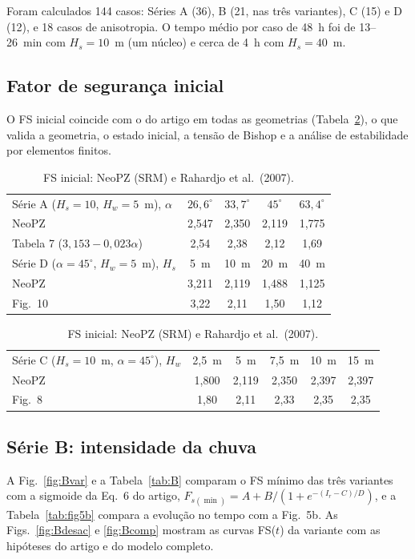 Foram calculados 144 casos: S\'eries A (36), B (21, nas tr\^es variantes), C (15) e D (12), e 18 casos de
anisotropia. O tempo m\'edio por caso de 48~h foi de 13--26~min com $H_s=10$~m (um n\'ucleo) e cerca de 4~h com
$H_s=40$~m.

\subsection{Fator de seguran\c{c}a inicial}

O FS inicial coincide com o do artigo em todas as geometrias (Tabela~\ref{tab:fsini}), o que valida a geometria, o
estado inicial, a tens\~ao de Bishop e a an\'alise de estabilidade por elementos finitos.

\begin{table}[htbp]
\centering
\caption{FS inicial: NeoPZ (SRM) e Rahardjo et al.\ (2007).}\label{tab:fsini}
\begin{tabular}{lcccc}
\toprule
S\'erie A ($H_s=10$, $H_w=5$~m), $\alpha$ & $26{,}6^\circ$ & $33{,}7^\circ$ & $45^\circ$ & $63{,}4^\circ$\\
NeoPZ & 2,547 & 2,350 & 2,119 & 1,775\\
Tabela 7 ($3{,}153-0{,}023\alpha$) & 2,54 & 2,38 & 2,12 & 1,69\\
\midrule
S\'erie D ($\alpha=45^\circ$, $H_w=5$~m), $H_s$ & 5~m & 10~m & 20~m & 40~m\\
NeoPZ & 3,211 & 2,119 & 1,488 & 1,125\\
Fig.~10 & 3,22 & 2,11 & 1,50 & 1,12\\
\bottomrule
\end{tabular}

\vspace{6pt}
\begin{tabular}{lccccc}
\toprule
S\'erie C ($H_s=10$~m, $\alpha=45^\circ$), $H_w$ & 2,5~m & 5~m & 7,5~m & 10~m & 15~m\\
NeoPZ & 1,800 & 2,119 & 2,350 & 2,397 & 2,397\\
Fig.~8 & 1,80 & 2,11 & 2,33 & 2,35 & 2,35\\
\bottomrule
\end{tabular}
\end{table}

\subsection{S\'erie B: intensidade da chuva}

A Fig.~\ref{fig:Bvar} e a Tabela~\ref{tab:B} comparam o FS m\'inimo das tr\^es variantes com a sigmoide da Eq.~6 do
artigo, $F_{s(\min)}=A+B/(1+e^{-(I_r-C)/D})$, e a Tabela~\ref{tab:fig5b} compara a evolu\c{c}\~ao no tempo com a
Fig.~5b. As Figs.~\ref{fig:Bdesac} e \ref{fig:Bcomp} mostram as curvas FS($t$) da variante com as hip\'oteses do
artigo e do modelo completo.

